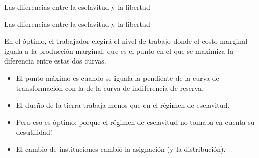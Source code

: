 \documentclass{beamer}
\begin{document}
\begin{frame}{Las diferencias entre la esclavitud y la libertad}
\begin{figure}[h!]
\begin{center}
        \end{center}
    \end{figure}
\end{frame}



\begin{frame}{Las diferencias entre la esclavitud y la libertad}
        \begin{boxB}
        \centering
        En el óptimo, el trabajador elegirá el nivel de trabajo donde el costo marginal iguala a la producción marginal, que es el punto en el que se maximiza la diferencia entre estas dos curvas.
        \end{boxB}
        \begin{itemize}
        \item El punto máximo es cuando se iguala la pendiente de la curva de transformación con la de la curva de indiferencia de reserva. 
        \item El dueño de la tierra trabaja menos que en el régimen de esclavitud.
        \item Pero eso es óptimo: porque el régimen de esclavitud no tomaba en cuenta su desutilidad!
        \item El cambio de instituciones cambió la asignación (y la distribución).
    \end{itemize}
\end{frame}
\end{document}
